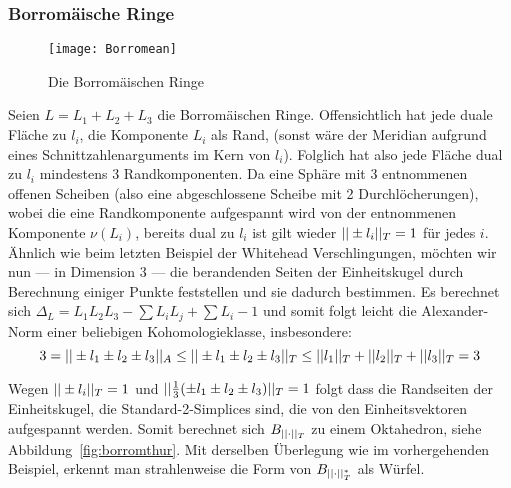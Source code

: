     \subsubsection*{Borromäische Ringe}

        \begin{wrapfigure}{r}{0.4\textwidth}
            \centering
            \texttt{[image: Borromean]}
            \caption{Die Borromäischen Ringe}
            \label{fig:borromean}
        \end{wrapfigure}
    Seien $L=L_1 + L_2 + L_3$ die Borromäischen Ringe. Offensichtlich hat jede duale Fläche zu $l_i$, die Komponente $L_i$ als Rand, (sonst wäre der Meridian aufgrund eines Schnittzahlenarguments im Kern von $l_i$). Folglich hat also jede Fläche dual zu $l_i$ mindestens 3 Randkomponenten. Da eine Sphäre mit 3 entnommenen offenen Scheiben (also eine abgeschlossene Scheibe mit 2 Durchlöcherungen), wobei die eine Randkomponente aufgespannt wird von der entnommenen Komponente $\nu(L_i)$, bereits dual zu $l_i$ ist gilt wieder $||\pm l_i||_T=1$ für jedes $i$. Ähnlich wie beim letzten Beispiel der Whitehead Verschlingungen, möchten wir nun --- in Dimension 3 --- die berandenden Seiten der Einheitskugel durch Berechnung einiger Punkte feststellen und sie dadurch bestimmen. Es berechnet sich $\Delta_L = L_1L_2L_3 -\sum L_iL_j + \sum L_i -1$ und somit folgt leicht die Alexander-Norm einer beliebigen Kohomologieklasse, insbesondere:
    \[
        3= ||\pm l_1 \pm l_2 \pm l_3||_A \leq ||\pm l_1 \pm l_2 \pm l_3||_T \leq  ||l_1||_T + ||l_2||_T + ||l_3||_T=3
    \]

    Wegen $||\pm l_i||_T = 1$  und $||\frac13(\pm l_1 \pm l_2 \pm l_3)||_T=1$ folgt dass die Randseiten der Einheitskugel, die Standard-2-Simplices sind, die von den Einheitsvektoren aufgespannt werden. Somit berechnet sich $B_{||\cdot||_T}$ zu einem Oktahedron, siehe Abbildung~\ref{fig:borromthur}. Mit derselben Überlegung wie im vorhergehenden Beispiel, erkennt man strahlenweise die Form von $B_{||\cdot||_T^*}$ als Würfel.

